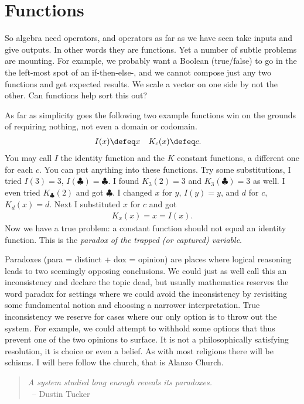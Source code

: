 
\section{Functions}
So algebra need operators, and operators as far as we have seen take 
inputs and give outputs.  In other words they are functions.  
Yet a number of subtle problems are 
mounting.  For example, we probably want a Boolean (true/false) to 
go in the the left-most spot of an if-then-else-, and we cannot compose 
just any two functions and get expected results.  We scale a vector on one side 
by not the other.  Can functions help sort this out?



As far as simplicity goes the following two example functions win 
on the grounds of requiring nothing, not even a domain or codomain.
\begin{align*}
    I(x) & \defeq x & 
    K_c(x) & \defeq c.
\end{align*}
You may call $I$ the identity function and the $K$ constant functions,
a different one for each $c$.  You can put anything into these functions.
Try some substitutions, I tried $I(3)=3$, $I(\clubsuit)=\clubsuit$.
I found $K_3(2)=3$ and $K_3(\clubsuit)=3$ as well.  I even tried 
$K_{\clubsuit}(2)$ and got $\clubsuit$.  I changed $x$ for $y$, 
$I(y)=y$, and $d$ for $c$, $K_d(x)=d$. Next I substituted $x$ for $c$ and got
\begin{align*}
    K_x(x)=x=I(x).
\end{align*}
Now we have a true problem: a constant function should not equal 
an identity function.  This is the \emph{paradox of the trapped (or captured) variable}.


Paradoxes (para = distinct + dox = opinion) are places where logical reasoning
leads to two seemingly opposing conclusions.  We could just as well call this an
inconsistency and declare the topic dead, but usually mathematics reserves the
word paradox for settings where we could avoid the inconsistency by revisiting
some fundamental notion and choosing a narrower interpretation.  True
inconsistency we reserve for cases where our only option is to throw out the
system.  For example, we could attempt to withhold some options that thus
prevent one of the two opinions to surface.  It is not a philosophically
satisfying resolution, it is choice or even a belief. As with most religions there
will be schisms.  I will here follow the church, that is Alanzo Church.

\begin{quote}
\emph{A system studied long enough reveals its paradoxes.}\\
~\hfill-- Dustin Tucker
\end{quote}

